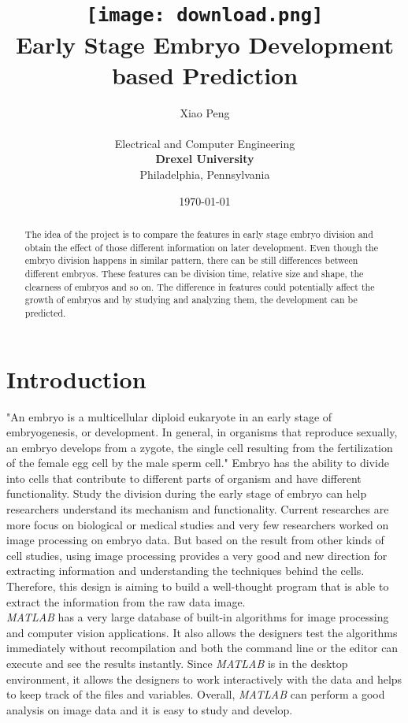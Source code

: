 \documentclass[12pt]{article}
\title{
\texttt{[image: download.png]} \\
\vspace*{1in}
\textbf{Early Stage Embryo Development based Prediction }}
\author{Xiao Peng\\
		\vspace*{0.5in} \\
		Electrical and Computer Engineering\\
        \textbf{Drexel University}\\
        Philadelphia, Pennsylvania
       } \date{\today}
\begin{document}
\maketitle

\newpage
\begin{abstract}

\qquad The idea of the project is to compare the features in early stage embryo division and obtain the effect of those different information on later development. Even though the embryo division happens in similar pattern, there can be still differences between different embryos. These features can be division time, relative size and shape, the clearness of embryos and so on. The difference in features could potentially affect the growth of embryos and by studying and analyzing them, the development can be predicted.

\end{abstract}

\newpage \section{Introduction}
    
\qquad "An embryo is a multicellular diploid eukaryote in an early stage of embryogenesis, or development. In general, in organisms that reproduce sexually, an embryo develops from a zygote, the single cell resulting from the fertilization of the female egg cell by the male sperm cell." Embryo has the ability to divide into cells that contribute to different parts of organism and have different functionality. Study the division during the early stage of embryo can help researchers understand its mechanism and functionality. Current researches are more focus on biological or medical studies and very few researchers worked on image processing on embryo data. But based on the result from other kinds of cell studies, using image processing provides a very good and new direction for extracting information and understanding the techniques behind the cells. Therefore, this design is aiming to build a well-thought program that is able to extract the information from the raw data image. \\

\noindent \qquad \textit{MATLAB} has a very large database of built-in algorithms for image processing and computer vision applications. It also allows the designers test the algorithms immediately without recompilation and both the command line or the editor can execute and see the results instantly. Since \textit{MATLAB} is in the desktop environment, it allows the designers to work interactively with the data and helps to keep track of the files and variables. Overall, \textit{MATLAB} can perform a good analysis on image data and it is easy to study and develop. \\
\end{document}
